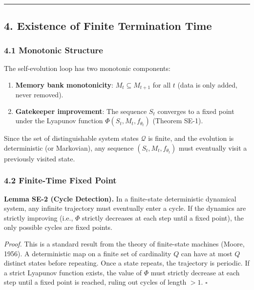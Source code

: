 \documentclass[
  12pt,
]{article}
\providecommand{\tightlist}{%
  \setlength{\itemsep}{0pt}\setlength{\parskip}{0pt}}
\begin{document}
\begin{center}\rule{0.5\linewidth}{0.5pt}\end{center}

\subsection{4. Existence of Finite Termination
Time}\label{existence-of-finite-termination-time}

\subsubsection{4.1 Monotonic Structure}\label{monotonic-structure}

The self-evolution loop has two monotonic components:

\begin{enumerate}
\def\labelenumi{\arabic{enumi}.}
\tightlist
\item
  \textbf{Memory bank monotonicity}: \(M_t \subseteq M_{t+1}\) for all
  \(t\) (data is only added, never removed).
\item
  \textbf{Gatekeeper improvement}: The sequence \(S_t\) converges to a
  fixed point under the Lyapunov function
  \(\Phi(S_t, M_t, f_{\theta_t})\) (Theorem SE-1).
\end{enumerate}

Since the set of distinguishable system states \(\mathcal{Q}\) is
finite, and the evolution is deterministic (or Markovian), any sequence
\((S_t, M_t, f_{\theta_t})\) must eventually visit a previously visited
state.

\subsubsection{4.2 Finite-Time Fixed
Point}\label{finite-time-fixed-point}

\textbf{Lemma SE-2 (Cycle Detection).} In a finite-state deterministic
dynamical system, any infinite trajectory must eventually enter a cycle.
If the dynamics are strictly improving (i.e., \(\Phi\) strictly
decreases at each step until a fixed point), the only possible cycles
are fixed points.

\emph{Proof.} This is a standard result from the theory of finite-state
machines (Moore, 1956). A deterministic map on a finite set of
cardinality \(Q\) can have at most \(Q\) distinct states before
repeating. Once a state repeats, the trajectory is periodic. If a strict
Lyapunov function exists, the value of \(\Phi\) must strictly decrease
at each step until a fixed point is reached, ruling out cycles of length
\(>1\). \(\square\)
\end{document}

